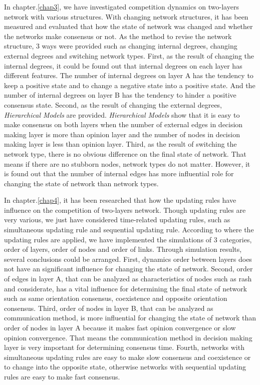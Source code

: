 In chapter.\ref{chap3}, we have investigated competition dynamics on two-layers network with various structures. With changing network structures, it has been measured and evaluated that how the state of network was changed and whether the networks make consensus or not. As the method to revise the network structure, $3$ ways were provided such as changing internal degrees, changing external degrees and switching network types. First, as the result of changing the internal degrees, it could be found out that internal degrees on each layer has different features. The number of internal degrees on layer A has the tendency to keep a positive state and to change a negative state into a positive state. And the number of internal degrees on layer B has the tendency to hinder a positive consensus state. Second, as the result of changing the external degrees, \textit{Hierarchical Models} are provided. \textit{Hierarchical Models} show that it is easy to make consensus on both layers when the number of external edges in decision making layer is more than opinion layer and the number of nodes in decision making layer is less than opinion layer. Third, as the result of switching the network type, there is no obvious difference on the final state of network. That means if there are no stubborn nodes, network types do not matter. However, it is found out that the number of internal edges has more influential role for changing the state of network than network types.

In chapter.\ref{chap4}, it has been researched that how the updating rules have influence on the competition of two-layers network. Though updating rules are very various, we just have considered time-related updating rules, such as simultaneous updating rule and sequential updating rule. According to where the updating rules are applied, we have implemented the simulations of $3$ categories, order of layers, order of nodes and order of links. Through simulation results, several conclusions could be arranged. First, dynamics order between layers does not have an significant influence for changing the state of network. Second, order of edges in layer A, that can be analyzed as characteristics of nodes such as rash and considerate, has a vital influence for determining the final state of network such as same orientation consensus, coexistence and opposite orientation consensus. Third, order of nodes in layer B, that can be analyzed as communication method, is more influential for changing the state of network than order of nodes in layer A because it makes fast opinion convergence or slow opinion convergence. That means the communication method in decision making layer is very important for determining consensus time. Fourth, networks with simultaneous updating rules are easy to make slow consensus and coexistence or to change into the opposite state, otherwise networks with sequential updating rules are easy to make fast consensus.


